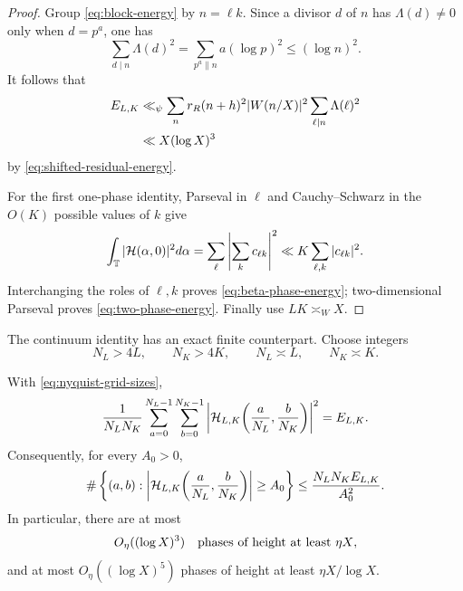 \begin{proof}
Group \eqref{eq:block-energy} by $n=\ell k$.  Since a divisor $d$ of
$n$ has $\Lambda(d)\ne0$ only when $d=p^a$, one has
\begin{equation}
 \sum_{d\mid n}\Lambda(d)^2
 =\sum_{p^a\parallel n}a(\log p)^2
 \le(\log n)^2.
 \label{eq:divisor-lambda-square}
\end{equation}
It follows that
\begin{align}
 E_{L,K}
 &\ll_\psi
 \sum_n r_R(n+h)^2|W(n/X)|^2
 \sum_{\ell\mid n}\Lambda(\ell)^2
 \notag\\
 &\ll X(\log X)^3
 \label{eq:block-energy-proof}
\end{align}
by \eqref{eq:shifted-residual-energy}.

For the first one-phase identity, Parseval in $\ell$ and
Cauchy--Schwarz in the $O(K)$ possible values of $k$ give
\[
 \int_\mathbb T|\mathcal H(\alpha,0)|^2d\alpha
 =\sum_\ell\left|\sum_kc_{\ell k}\right|^2
 \ll K\sum_{\ell,k}|c_{\ell k}|^2.
\]
Interchanging the roles of $\ell,k$ proves
\eqref{eq:beta-phase-energy}; two-dimensional Parseval proves
\eqref{eq:two-phase-energy}.  Finally use $LK\asymp_WX$.
\end{proof}

The continuum identity has an exact finite counterpart.  Choose
integers
\begin{equation}
 N_L>4L,
 \qquad N_K>4K,
 \qquad N_L\asymp L,
 \qquad N_K\asymp K.
 \label{eq:nyquist-grid-sizes}
\end{equation}

\begin{theorem}
\label{thm:nyquist-parseval}
With \eqref{eq:nyquist-grid-sizes},
\begin{equation}
 \frac1{N_LN_K}
 \sum_{a=0}^{N_L-1}\sum_{b=0}^{N_K-1}
 \left|\mathcal H_{L,K}\!\left(\frac a{N_L},\frac b{N_K}\right)\right|^2
 =E_{L,K}.
 \label{eq:exact-nyquist-parseval}
\end{equation}
Consequently, for every $A_0>0$,
\begin{equation}
 \#\left\{(a,b):
 \left|\mathcal H_{L,K}\!\left(\frac a{N_L},\frac b{N_K}\right)\right|
 \ge A_0\right\}
 \le\frac{N_LN_KE_{L,K}}{A_0^2}.
 \label{eq:exceptional-phase-count}
\end{equation}
In particular, there are at most
\begin{equation}
 O_\eta((\log X)^3)
 \quad\hbox{phases of height at least $\eta X$},
 \label{eq:natural-phase-count}
\end{equation}
and at most $O_\eta((\log X)^5)$ phases of height at least
$\eta X/\log X$.
\end{theorem}

